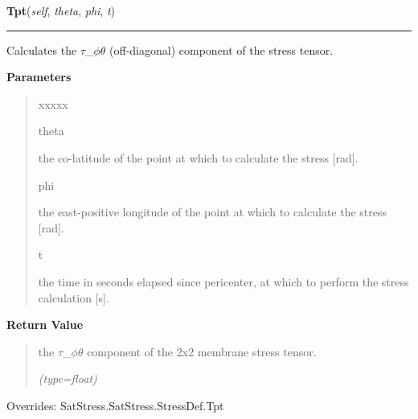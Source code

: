     \vspace{0.5ex}

\hspace{.8\funcindent}\begin{boxedminipage}{\funcwidth}

    \raggedright \textbf{Tpt}(\textit{self}, \textit{theta}, \textit{phi}, \textit{t})

    \vspace{-1.5ex}

    \rule{\textwidth}{0.5\fboxrule}
\setlength{\parskip}{2ex}
    Calculates the \(\tau\)\_\(\phi\)\(\theta\) (off-diagonal) component of
    the stress tensor.

\setlength{\parskip}{1ex}
      \textbf{Parameters}
      \vspace{-1ex}

      \begin{quote}
        \begin{Ventry}{xxxxx}

          \item[theta]

          the co-latitude of the point at which to calculate the stress 
          [rad].

          \item[phi]

          the east-positive longitude of the point at which to calculate 
          the stress [rad].

          \item[t]

          the time in seconds elapsed since pericenter, at which to perform
          the stress calculation [s].

        \end{Ventry}

      \end{quote}

      \textbf{Return Value}
    \vspace{-1ex}

      \begin{quote}
      the \(\tau\)\_\(\phi\)\(\theta\) component of the 2x2 membrane stress
      tensor.

      {\it (type=float)}

      \end{quote}

      Overrides: SatStress.SatStress.StressDef.Tpt

    \end{boxedminipage}


